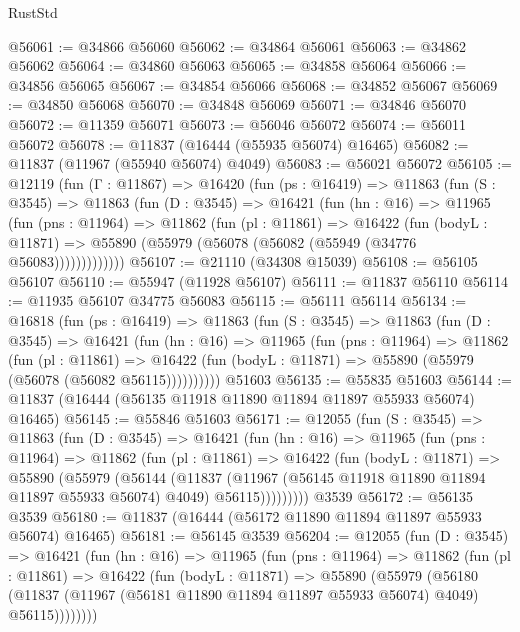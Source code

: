 \begin{lexlean}{RustStd}
\begin{coremodule}
@56061 := @34866 @56060
@56062 := @34864 @56061
@56063 := @34862 @56062
@56064 := @34860 @56063
@56065 := @34858 @56064
@56066 := @34856 @56065
@56067 := @34854 @56066
@56068 := @34852 @56067
@56069 := @34850 @56068
@56070 := @34848 @56069
@56071 := @34846 @56070
@56072 := @11359 @56071
@56073 := @56046 @56072
@56074 := @56011 @56072
@56078 := @11837 (@16444 (@55935 @56074) @16465)
@56082 := @11837 (@11967 (@55940 @56074) @4049)
@56083 := @56021 @56072
@56105 := @12119
    (fun (Γ : @11867) =>
    @16420
      (fun (ps : @16419) =>
      @11863
        (fun (S : @3545) =>
        @11863
          (fun (D : @3545) =>
          @16421
            (fun (hn : @16) =>
            @11965
              (fun (pns : @11964) =>
              @11862
                (fun (pl : @11861) =>
                @16422
                  (fun (bodyL : @11871) =>
                  @55890 (@55979 (@56078 (@56082 (@55949 (@34776 @56083)))))))))))))
@56107 := @21110 (@34308 @15039)
@56108 := @56105 @56107
@56110 := @55947 (@11928 @56107)
@56111 := @11837 @56110
@56114 := @11935 @56107 @34775 @56083
@56115 := @56111 @56114
@56134 := @16818
    (fun (ps : @16419) =>
    @11863
      (fun (S : @3545) =>
      @11863
        (fun (D : @3545) =>
        @16421
          (fun (hn : @16) =>
          @11965
            (fun (pns : @11964) =>
            @11862
              (fun (pl : @11861) =>
              @16422 (fun (bodyL : @11871) => @55890 (@55979 (@56078 (@56082 @56115))))))))))
    @51603
@56135 := @55835 @51603
@56144 := @11837 (@16444 (@56135 @11918 @11890 @11894 @11897 @55933 @56074) @16465)
@56145 := @55846 @51603
@56171 := @12055
    (fun (S : @3545) =>
    @11863
      (fun (D : @3545) =>
      @16421
        (fun (hn : @16) =>
        @11965
          (fun (pns : @11964) =>
          @11862
            (fun (pl : @11861) =>
            @16422
              (fun (bodyL : @11871) =>
              @55890
                (@55979
                  (@56144
                    (@11837
                      (@11967 (@56145 @11918 @11890 @11894 @11897 @55933 @56074) @4049)
                      @56115)))))))))
    @3539
@56172 := @56135 @3539
@56180 := @11837 (@16444 (@56172 @11890 @11894 @11897 @55933 @56074) @16465)
@56181 := @56145 @3539
@56204 := @12055
    (fun (D : @3545) =>
    @16421
      (fun (hn : @16) =>
      @11965
        (fun (pns : @11964) =>
        @11862
          (fun (pl : @11861) =>
          @16422
            (fun (bodyL : @11871) =>
            @55890
              (@55979
                (@56180
                  (@11837 (@11967 (@56181 @11890 @11894 @11897 @55933 @56074) @4049) @56115))))))))

\end{coremodule}
\end{lexlean}
